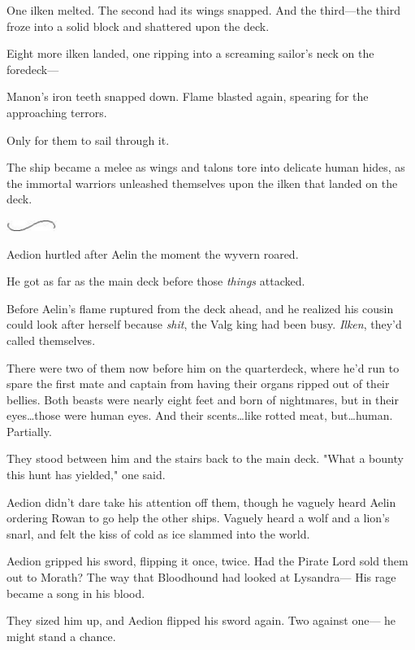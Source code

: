 One ilken melted.
The second had its wings snapped.
And the third---the third froze into a solid block and shattered upon the deck.

Eight more ilken landed, one ripping into a screaming sailor's neck on the foredeck---

Manon's iron teeth snapped down.
Flame blasted again, spearing for the approaching terrors.

Only for them to sail through it.

The ship became a melee as wings and talons tore into delicate human hides, as the immortal warriors unleashed themselves upon the ilken that landed on the deck.

\begin{center}
	\includegraphics[width=0.65in,height=0.13in]{images/seperator}
\end{center}

Aedion hurtled after Aelin the moment the wyvern roared.

He got as far as the main deck before those \emph{things} attacked.

Before Aelin's flame ruptured from the deck ahead, and he realized his cousin could look after herself because \emph{shit}, the Valg king had been busy.
\emph{Ilken}, they'd called themselves.

There were two of them now before him on the quarterdeck, where he'd run to spare the first mate and captain from having their organs ripped out of their bellies.
Both beasts were nearly eight feet and born of nightmares, but in their eyes\ldots those were human eyes.
And their scents\ldots like rotted meat, but\ldots human.
Partially.

They stood between him and the stairs back to the main deck.
"What a bounty this hunt has yielded," one said.

Aedion didn't dare take his attention off them, though he vaguely heard Aelin ordering Rowan to go help the other ships.
Vaguely heard a wolf and a lion's snarl, and felt the kiss of cold as ice slammed into the world.

Aedion gripped his sword, flipping it once, twice.
Had the Pirate Lord sold them out to Morath?
The way that Bloodhound had looked at Lysandra--- His rage became a song in his blood.

They sized him up, and Aedion flipped his sword again.
Two against one--- he might stand a chance.

